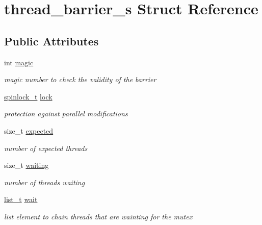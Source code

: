\hypertarget{structthread__barrier__s}{\section{thread\-\_\-barrier\-\_\-s Struct Reference}
\label{structthread__barrier__s}
}
\subsection*{Public Attributes}
\begin{DoxyCompactItemize}
\item 
int \hyperlink{structthread__barrier__s_a0ca24d9e62459d13238ea86bbb85c61c}{magic}
\begin{DoxyCompactList}\small\item\em magic number to check the validity of the barrier \end{DoxyCompactList}\item 
\hyperlink{atomic_8h_ac96e125536af227ccca8875138c83e42}{spinlock\-\_\-t} \hyperlink{structthread__barrier__s_a8bbb69142ae57e50b5c83c31a8b00138}{lock}
\begin{DoxyCompactList}\small\item\em protection against parallel modifications \end{DoxyCompactList}\item 
size\-\_\-t \hyperlink{structthread__barrier__s_a49aeee62a81db234144e01be301540ef}{expected}
\begin{DoxyCompactList}\small\item\em number of expected threads \end{DoxyCompactList}\item 
size\-\_\-t \hyperlink{structthread__barrier__s_a2d4b05b20a64eb8536021d7a553c1de1}{waiting}
\begin{DoxyCompactList}\small\item\em number of threads waiting \end{DoxyCompactList}\item 
\hyperlink{list_8h_ad3b2684139c847cd572cb7b9679ce227}{list\-\_\-t} \hyperlink{structthread__barrier__s_a64884bf0d1a1ef7f4a06521553e2e066}{wait}
\begin{DoxyCompactList}\small\item\em list element to chain threads that are wainting for the mutex \end{DoxyCompactList}\end{DoxyCompactItemize}


